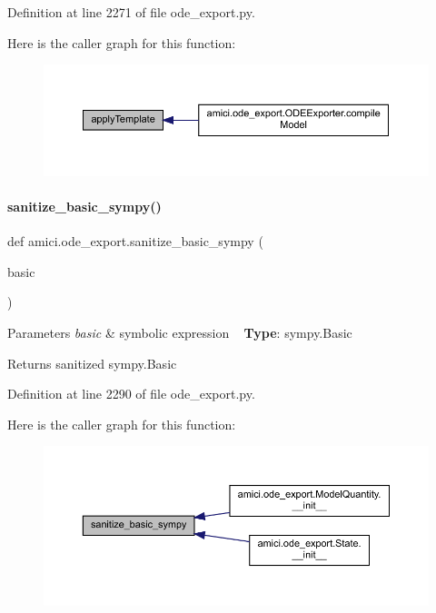 Definition at line 2271 of file ode\+\_\+export.\+py.

Here is the caller graph for this function\+:
\nopagebreak
\begin{figure}[H]
\begin{center}
\leavevmode
\includegraphics[width=350pt]{namespaceamici_1_1ode__export_af4b013340d08cdef3247601d2bf0b62f_icgraph}
\end{center}
\end{figure}
\mbox{\label{namespaceamici_1_1ode__export_af0bfa7839b41792994b1add20b86cf8e}} 
\paragraph{\texorpdfstring{sanitize\+\_\+basic\+\_\+sympy()}{sanitize\_basic\_sympy()}}
{\footnotesize\ttfamily def amici.\+ode\+\_\+export.\+sanitize\+\_\+basic\+\_\+sympy (\begin{DoxyParamCaption}\item[{}]{basic }\end{DoxyParamCaption})}


\begin{DoxyParams}{Parameters}
{\em basic} & symbolic expression ~\newline
{\bfseries Type}\+: sympy.\+Basic\\
\hline
\end{DoxyParams}
\begin{DoxyReturn}{Returns}
sanitized sympy.\+Basic 
\end{DoxyReturn}


Definition at line 2290 of file ode\+\_\+export.\+py.

Here is the caller graph for this function\+:
\nopagebreak
\begin{figure}[H]
\begin{center}
\leavevmode
\includegraphics[width=350pt]{namespaceamici_1_1ode__export_af0bfa7839b41792994b1add20b86cf8e_icgraph}
\end{center}
\end{figure}


